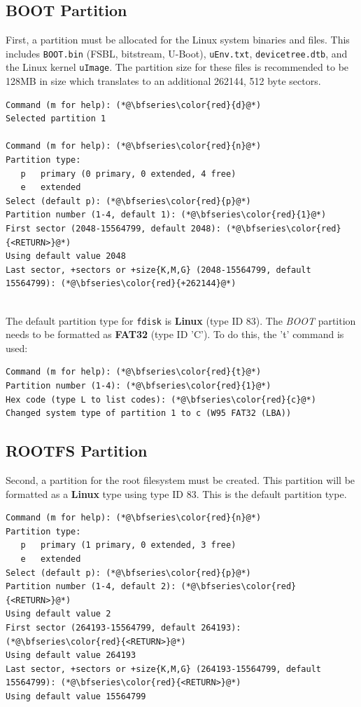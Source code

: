 \subsection{BOOT Partition}
First, a partition must be allocated for the Linux system binaries and files. This includes \texttt{BOOT.bin} (FSBL, bitstream, U-Boot), \texttt{uEnv.txt}, \texttt{devicetree.dtb}, and the Linux kernel \texttt{uImage}. The partition size for these files is recommended to be 128MB in size which translates to an additional 262144, 512 byte sectors. \\

\begin{lstlisting}[style=text]
Command (m for help): (*@\bfseries\color{red}{d}@*)
Selected partition 1

Command (m for help): (*@\bfseries\color{red}{n}@*)
Partition type:
   p   primary (0 primary, 0 extended, 4 free)
   e   extended
Select (default p): (*@\bfseries\color{red}{p}@*)
Partition number (1-4, default 1): (*@\bfseries\color{red}{1}@*)
First sector (2048-15564799, default 2048): (*@\bfseries\color{red}{<RETURN>}@*)
Using default value 2048
Last sector, +sectors or +size{K,M,G} (2048-15564799, default 15564799): (*@\bfseries\color{red}{+262144}@*)
\end{lstlisting}


~\\
\noindent
The default partition type for \texttt{fdisk} is \textbf{Linux} (type ID 83). The \textit{BOOT} partition needs to be formatted as \textbf{FAT32} (type ID 'C'). To do this, the 't' command is used: \\

\begin{lstlisting}[style=text]
Command (m for help): (*@\bfseries\color{red}{t}@*)
Partition number (1-4): (*@\bfseries\color{red}{1}@*)
Hex code (type L to list codes): (*@\bfseries\color{red}{c}@*)
Changed system type of partition 1 to c (W95 FAT32 (LBA))
\end{lstlisting}

\subsection{ROOTFS Partition}
Second, a partition for the root filesystem must be created. This partition will be formatted as a \textbf{Linux} type using type ID 83. This is the default partition type. \\
\begin{lstlisting}[style=text]
Command (m for help): (*@\bfseries\color{red}{n}@*)
Partition type:
   p   primary (1 primary, 0 extended, 3 free)
   e   extended
Select (default p): (*@\bfseries\color{red}{p}@*)
Partition number (1-4, default 2): (*@\bfseries\color{red}{<RETURN>}@*)
Using default value 2
First sector (264193-15564799, default 264193): (*@\bfseries\color{red}{<RETURN>}@*)
Using default value 264193
Last sector, +sectors or +size{K,M,G} (264193-15564799, default 15564799): (*@\bfseries\color{red}{<RETURN>}@*)
Using default value 15564799
\end{lstlisting}

